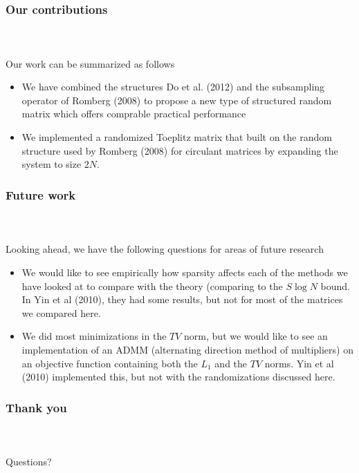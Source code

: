 \begin{frame}[t]
	\frametitle{Our contributions}
	\framesubtitle{~~}  %

	Our work can be summarized as follows
	\begin{itemize}
		\item We have combined the structures Do et al. (2012) and the subsampling operator 
			of Romberg (2008) to propose a new type of structured random matrix which offers 
			comprable practical performance
		\item We implemented a randomized Toeplitz matrix that built on the random structure
			used by Romberg (2008) for circulant matrices by expanding the system to size $2N$.
	\end{itemize}

\end{frame}



\begin{frame}[t]
	\frametitle{Future work}
	\framesubtitle{~~}  %

	Looking ahead, we have the following questions for areas of future research
	\begin{itemize}
		\item We would like to see empirically how sparsity affects each of the methods we 
			have looked at to compare with the theory (comparing to the $S\log{N}$ bound. In 
			Yin et al (2010), they had some results, but not for most of the matrices we 
			compared here. 
		\item We did most minimizations in the $TV$ norm, but we would like to see an 
			implementation of an ADMM (alternating direction method of multipliers) on an
			objective function containing both the $L_1$ and the $TV$ norms. Yin et al (2010)
			implemented this, but not with the randomizations discussed here. 
	\end{itemize}

\end{frame}

\begin{frame}[t]
	\frametitle{Thank you}
	\framesubtitle{~~}  %
	Questions?
\end{frame}

